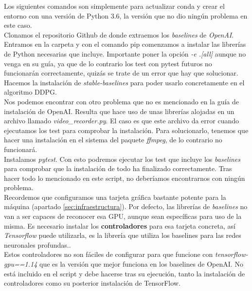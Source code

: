 \documentclass[11pt,fleqn]{book} %
\begin{document}
Los siguientes comandos son simplemente para actualizar conda y crear el entorno con una versión de Python 3.6, la versión que no dio ningún problema en este caso. \\

Clonamos el repositorio Github de donde extraemos los \textit{baselines} de \textit{OpenAI}. Entramos en la carpeta y con el comando pip comenzamos a instalar las librerías de Python necesarias que incluye. Importante poner la opción \textit{-e .[all]} aunque no venga en su guía, ya que de lo contrario los test con pytest futuros no funcionarán correctamente, quizás se trate de un error que hay que solucionar. \\

Hacemos la instalación de \textit{stable-baselines}\cite{article:stablebaselinesinstalation} para poder usarlo concretamente en el algoritmo DDPG. \\

Nos podemos encontrar con otro problema que no es mencionado en la guía de instalación de OpenAI. Resulta que hace uso de unas librerías alojadas en un archivo llamado \textit{video\_recorder.py}. El caso es que este archivo da error cuando ejecutamos los test para comprobar la instalación. Para solucionarlo, tenemos que hacer una instalación en el sistema del paquete \textit{ffmpeg}, de lo contrario no funcionará. \\

Instalamos \textit{pytest}. Con esto podremos ejecutar los test que incluye los \textit{baselines} para comprobar que la instalación de todo ha finalizado correctamente. Tras hacer todo lo mencionado en este script, no deberíamos encontrarnos con ningún problema. \\

Recordemos que configuramos una tarjeta gráfica bastante potente para la máquina (apartado \ref{sec:infraestructura}). Por defecto, las librerías de \textit{baselines} no van a ser capaces de reconocer esa GPU, aunque sean específicas para uso de la misma. Es necesario instalar los \textbf{controladores} para esa tarjeta concreta, así \textit{Tensorflow} puede utilizarla, es la librería que utiliza los baselines para las redes neuronales profundas.\cite{article:tensorflow}.\\

Estos controladores no son fáciles de configurar para que funcione con \textit{tensorflow-gpu==1.14} que es la versión que mejor funciona en los baselines de OpenAI. No está incluido en el script y debe hacerse tras su ejecución, tanto la instalación de controladores como su posterior instalación de TensorFlow.\\
\end{document}
